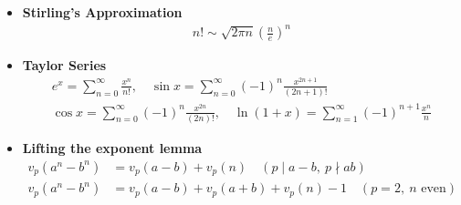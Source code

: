 \begin{itemize}
    \item \textbf{Stirling's Approximation} \\ 
    \begin{equation*}
    \begin{aligned}
    n! \sim \sqrt{2\pi n}\left(\frac{n}{e}\right)^n
    \end{aligned}
    \end{equation*}

    \item \textbf{Taylor Series} \\
    \begin{equation*}
    \begin{gathered}
    e^x = \sum_{n=0}^{\infty} \frac{x^n}{n!}, \quad
\sin x = \sum_{n=0}^{\infty} (-1)^n \frac{x^{2n+1}}{(2n+1)!} \\
\cos x = \sum_{n=0}^{\infty} (-1)^n \frac{x^{2n}}{(2n)!}, \quad
\ln(1+x) = \sum_{n=1}^{\infty} (-1)^{n+1} \frac{x^n}{n}
    \end{gathered}
    \end{equation*}

    \item \textbf{Lifting the exponent lemma} \\
    \begin{equation*}
    \begin{aligned}
    v_p(a^n - b^n) &= v_p(a-b) + v_p(n)
\quad (p \mid a-b,\ p \nmid ab) \\
v_p(a^n - b^n) &= v_p(a-b) + v_p(a+b) + v_p(n) - 1
\quad (p = 2,\ n \text{ even})
    \end{aligned}
    \end{equation*}


\end{itemize}
